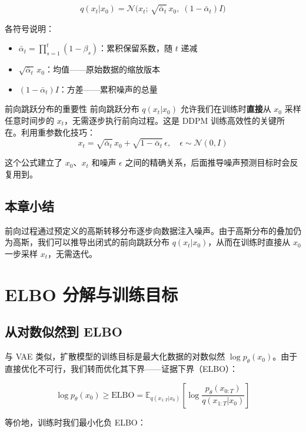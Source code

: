 \documentclass[a4paper]{article}
\begin{document}
$$q(x_t | x_0) = \mathcal{N}\big(x_t;\, \sqrt{\bar{\alpha}_t}\, x_0,\; (1 - \bar{\alpha}_t) I\big)$$

各符号说明：
\begin{itemize}
    \item $\bar{\alpha}_t = \prod_{s=1}^{t}(1-\beta_s)$：累积保留系数，随 $t$ 递减
    \item $\sqrt{\bar{\alpha}_t}\, x_0$：均值——原始数据的缩放版本
    \item $(1 - \bar{\alpha}_t) I$：方差——累积噪声的总量
\end{itemize}

\begin{importantbox}{前向跳跃分布的重要性}
前向跳跃分布 $q(x_t|x_0)$ 允许我们在训练时\textbf{直接}从 $x_0$ 采样任意时间步的 $x_t$，无需逐步执行前向过程。这是 DDPM 训练高效性的关键所在。利用重参数化技巧：
$$x_t = \sqrt{\bar{\alpha}_t}\, x_0 + \sqrt{1 - \bar{\alpha}_t}\, \epsilon, \quad \epsilon \sim \mathcal{N}(0, I)$$
\end{importantbox}

这个公式建立了 $x_0$、$x_t$ 和噪声 $\epsilon$ 之间的精确关系，后面推导噪声预测目标时会反复用到。

\subsection{本章小结}

前向过程通过预定义的高斯转移分布逐步向数据注入噪声。由于高斯分布的叠加仍为高斯，我们可以推导出闭式的前向跳跃分布 $q(x_t|x_0)$，从而在训练时直接从 $x_0$ 一步采样 $x_t$，无需迭代。


\section{ELBO 分解与训练目标}

\subsection{从对数似然到 ELBO}

与 VAE 类似，扩散模型的训练目标是最大化数据的对数似然 $\log p_\theta(x_0)$。由于直接优化不可行，我们转而优化其下界——证据下界（ELBO）：

$$\log p_\theta(x_0) \geq \text{ELBO} = \mathbb{E}_{q(x_{1:T}|x_0)}\left[\log \frac{p_\theta(x_{0:T})}{q(x_{1:T}|x_0)}\right]$$

等价地，训练时我们最小化负 ELBO：
\end{document}
